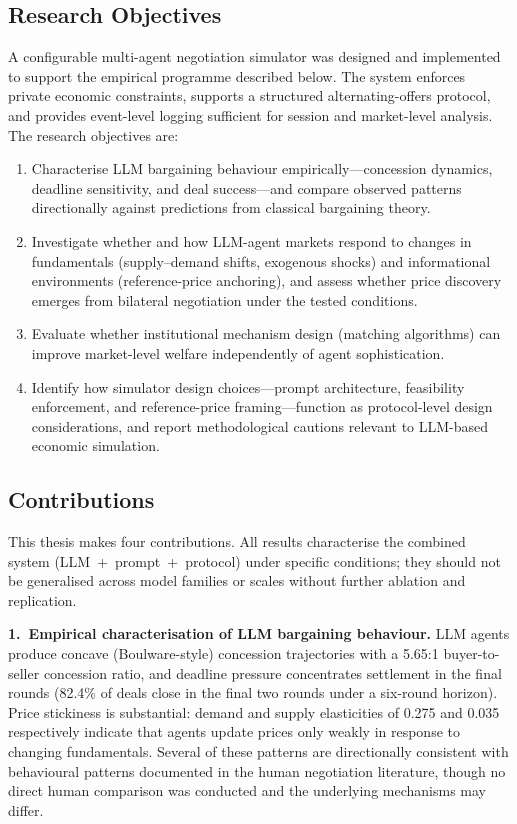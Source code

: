 \subsection{Research Objectives}

A configurable multi-agent negotiation simulator was designed and
implemented to support the empirical programme described below.  The system
enforces private economic constraints, supports a structured alternating-offers
protocol, and provides event-level logging sufficient for session and
market-level analysis.  The research objectives are:

\begin{enumerate}
    \item Characterise LLM bargaining behaviour empirically---concession
    dynamics, deadline sensitivity, and deal success---and compare observed
    patterns directionally against predictions from classical bargaining
    theory.

    \item Investigate whether and how LLM-agent markets respond to changes
    in fundamentals (supply--demand shifts, exogenous shocks) and
    informational environments (reference-price anchoring), and assess
    whether price discovery emerges from bilateral negotiation under the
    tested conditions.

    \item Evaluate whether institutional mechanism design (matching
    algorithms) can improve market-level welfare independently of agent
    sophistication.

    \item Identify how simulator design choices---prompt architecture,
    feasibility enforcement, and reference-price framing---function as
    protocol-level design considerations, and report methodological cautions relevant to
    LLM-based economic simulation.
\end{enumerate}

\subsection{Contributions}

This thesis makes four contributions.  All results characterise the
combined system (LLM~+~prompt~+~protocol) under specific conditions; they
should not be generalised across model families or scales without further
ablation and replication.

\textbf{1.\ Empirical characterisation of LLM bargaining behaviour.}
LLM agents produce concave (Boulware-style) concession trajectories with
a 5.65:1 buyer-to-seller concession ratio, and deadline pressure
concentrates settlement in the final rounds (82.4\% of deals close in the
final two rounds under a six-round horizon).  Price stickiness is
substantial: demand and supply elasticities of 0.275 and 0.035
respectively indicate that agents update prices only weakly in response to
changing fundamentals.  Several of these patterns are directionally
consistent with behavioural patterns documented in the human negotiation
literature, though no direct human comparison was conducted and the
underlying mechanisms may differ.

